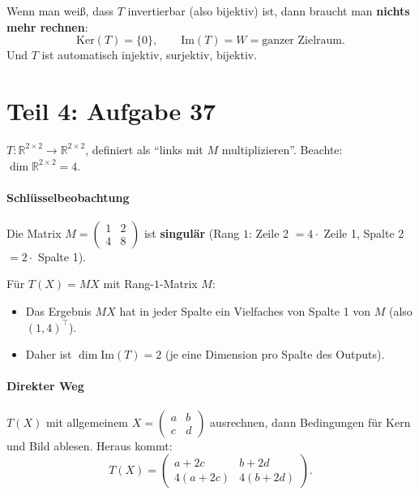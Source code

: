 \documentclass[a4paper,12pt]{article}
\begin{document}
\begin{merkbox}[title={Faustregel}]
Wenn man wei\ss, dass $T$ invertierbar (also bijektiv) ist, dann braucht man \textbf{nichts mehr rechnen}:
\[
\text{Ker}(T) = \{0\}, \qquad \text{Im}(T) = W = \text{ganzer Zielraum}.
\]
Und $T$ ist automatisch injektiv, surjektiv, bijektiv.
\end{merkbox}

\newpage

\part*{Teil 4: Aufgabe 37}

$T \colon \mathbb{R}^{2\times 2} \to \mathbb{R}^{2\times 2}$, definiert als ``links mit $M$ multiplizieren''. Beachte: $\dim \mathbb{R}^{2\times 2} = 4$.

\subsection*{Schl\"usselbeobachtung}

Die Matrix $M = \begin{pmatrix} 1 & 2 \\ 4 & 8 \end{pmatrix}$ ist \textbf{singul\"ar} (Rang $1$: Zeile 2 $= 4 \cdot$ Zeile 1, Spalte 2 $= 2 \cdot$ Spalte 1).

\begin{merkbox}[title={Konsequenz}]
F\"ur $T(X) = M X$ mit Rang-$1$-Matrix $M$:
\begin{itemize}[nosep]
    \item Das Ergebnis $M X$ hat in jeder Spalte ein Vielfaches von Spalte 1 von $M$ (also $(1, 4)^\top$).
    \item Daher ist $\dim \text{Im}(T) = 2$ (je eine Dimension pro Spalte des Outputs).
\end{itemize}
\end{merkbox}

\subsection*{Direkter Weg}

$T(X)$ mit allgemeinem $X = \begin{pmatrix} a & b \\ c & d \end{pmatrix}$ ausrechnen, dann Bedingungen f\"ur Kern und Bild ablesen. Heraus kommt:
\[
T(X) = \begin{pmatrix} a + 2c & b + 2d \\ 4(a + 2c) & 4(b + 2d) \end{pmatrix}.
\]
\end{document}
